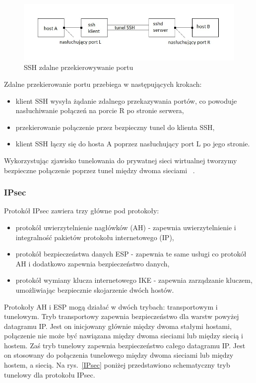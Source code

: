 \documentclass[12p]{article}
\begin{document}
\begin{figure}[H]
\centering
\includegraphics[width=12cm]{przekierowywanie_zdalne_SSH.jpg}
\caption{SSH zdalne przekierowywanie portu}\label{SSH_1}
\end{figure}

Zdalne przekierowanie portu przebiega w następujących krokach:
\begin{itemize}
\item klient SSH wysyła żądanie zdalnego przekazywania portów, co powoduje nasłuchiwanie połączeń na porcie R po stronie serwera,
\item przekierowanie połączenie przez bezpieczny tunel do klienta SSH,
\item klient SSH łączy się do hosta A poprzez nasłuchujący port L po jego stronie.
\end{itemize}
\quad 
Wykorzystując zjawisko tunelowania do prywatnej sieci wirtualnej tworzymy bezpieczne połączenie poprzez tunel między dwoma sieciami ~\cite{SSH}.

\subsubsection{IPsec}
\quad Protokół IPsec zawiera trzy główne pod protokoły:
\begin{itemize}
\item protokół uwierzytelnienie nagłówków (AH) - zapewnia uwierzytelnienie i integralność pakietów protokołu internetowego (IP),
\item  protokół bezpieczeństwa danych ESP - zapewnia te same usługi co protokół AH i dodatkowo zapewnia bezpieczeństwo danych,
\item protokół wymiany klucza internetowego IKE - zapewnia zarządzanie kluczem, umożliwiając bezpiecznie skojarzenie dwóch hostów.
\end{itemize}
\quad Protokoły AH i ESP mogą działać w dwóch trybach: transportowym i tunelowym. Tryb transportowy zapewnia bezpieczeństwo dla warstw powyżej datagramu IP. Jest on inicjowany głównie między dwoma stałymi hostami, połączenie nie może być nawiązana między dwoma sieciami lub między siecią i hostem. Zaś tryb tunelowy zapewnia bezpieczeństwo całego datagramu IP. Jest on stosowany do połączenia tunelowego między dwoma sieciami lub między hostem, a siecią. Na rys.~\ref{IPsec} poniżej przedstawiono schematyczny tryb tunelowy dla protokołu IPsec.
\end{document}
